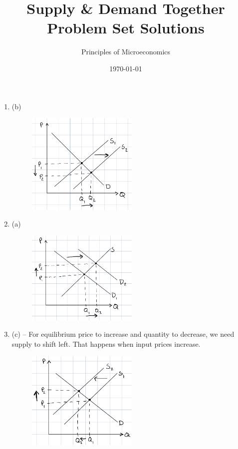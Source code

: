 \documentclass{article}
\title{Supply \& Demand Together Problem Set Solutions}
\author{Principles of Microeconomics}
\date{\today}
\begin{document}
\maketitle

\begin{enumerate}

\item (b)
	\begin{figure}[h]
	\centering
	\includegraphics[width = 0.5\textwidth]{problem1}
	\end{figure}

\item (a)
	\begin{figure}[h]
	\centering
	\includegraphics[width = 0.5\textwidth]{problem2}
	\end{figure}

\item (c) -- For equilibrium price to increase and quantity to decrease, we need supply to shift left. That happens when input prices increase.
	\begin{figure}[h]
	\centering
	\includegraphics[width = 0.5\textwidth]{problem3}
	\end{figure}


\end{enumerate}
\end{document}
